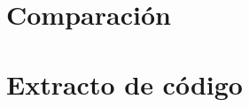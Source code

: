 \begin{appendices}
\chapter{Comparación}
\label{chap:comparaciondeOntologias}


\chapter{Extracto de código}

\end{appendices}